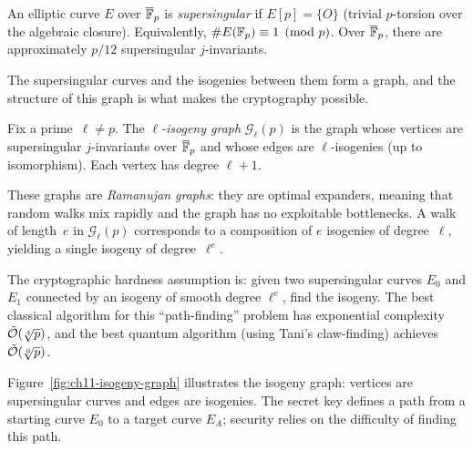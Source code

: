 \begin{definition}
\label{def:supersingular}
An elliptic curve $E$ over $\overline{\mathbb{F}}_p$ is \emph{supersingular} if $E[p] = \{O\}$ (trivial $p$-torsion over the algebraic closure).  Equivalently, $\#E(\mathbb{F}_p) \equiv 1 \pmod{p}$.  Over $\overline{\mathbb{F}}_p$, there are approximately $p/12$ supersingular $j$-invariants.
\end{definition}

The supersingular curves and the isogenies between them form a graph, and the structure of this graph is what makes the cryptography possible.

\begin{definition}
\label{def:ss-graph}
Fix a prime~$\ell \neq p$.  The \emph{$\ell$-isogeny graph} $\mathcal{G}_\ell(p)$ is the graph whose vertices are supersingular $j$-invariants over $\overline{\mathbb{F}}_p$ and whose edges are $\ell$-isogenies (up to isomorphism).  Each vertex has degree $\ell + 1$.
\end{definition}

These graphs are \emph{Ramanujan graphs}: they are optimal expanders, meaning that random walks mix rapidly and the graph has no exploitable bottlenecks.  A walk of length~$e$ in $\mathcal{G}_\ell(p)$ corresponds to a composition of $e$ isogenies of degree~$\ell$, yielding a single isogeny of degree~$\ell^e$.

The cryptographic hardness assumption is: given two supersingular curves $E_0$ and $E_1$ connected by an isogeny of smooth degree $\ell^e$, find the isogeny.  The best classical algorithm for this ``path-finding'' problem has exponential complexity $\tilde{\mathcal{O}}(\sqrt[4]{p})$, and the best quantum algorithm (using Tani's claw-finding) achieves $\tilde{\mathcal{O}}(\sqrt[6]{p})$.

Figure~\ref{fig:ch11-isogeny-graph} illustrates the isogeny graph: vertices are supersingular curves and edges are isogenies.  The secret key defines a path from a starting curve $E_0$ to a target curve $E_A$; security relies on the difficulty of finding this path.

